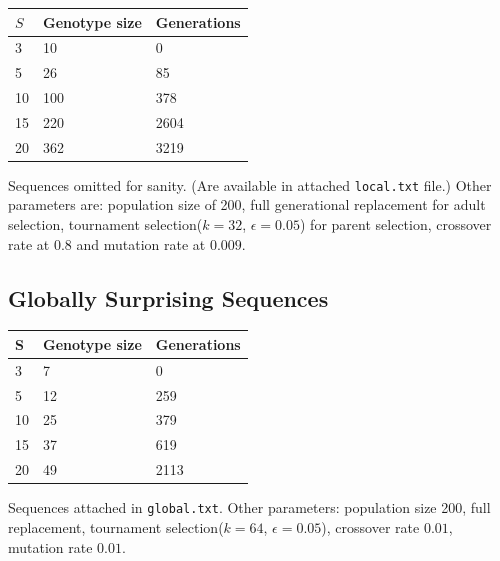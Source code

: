 \documentclass[twoside]{article}
\begin{document}
\begin{multicols}{2}
    \begin{table}[H]
        \centering
        \begin{tabular}{|l|l|l|}
            \hline
            $S$  & Genotype size & Generations \\ \hline
            3    & 10            & 0           \\ \hline
            5    & 26            & 85          \\ \hline
            10   & 100           & 378         \\ \hline
            15   & 220           & 2604        \\ \hline
            20   & 362           & 3219        \\ \hline
        \end{tabular}
    \end{table}

    Sequences omitted for sanity. (Are available in attached \texttt{local.txt} file.)
    Other parameters are: population size of 200, full generational replacement for adult selection, tournament selection($k=32$, $\epsilon = 0.05$) for parent selection, crossover rate at $0.8$ and mutation rate at $0.009$.


    \subsection{Globally Surprising Sequences}

    \begin{table}[H]
        \centering
        \begin{tabular}{|l|l|l|}
            \hline
            S  & Genotype size & Generations \\ \hline
            3  & 7             & 0           \\ \hline
            5  & 12            & 259         \\ \hline
            10 & 25            & 379         \\ \hline
            15 & 37            & 619         \\ \hline
            20 & 49            & 2113        \\ \hline
        \end{tabular}
    \end{table}

    Sequences attached in \texttt{global.txt}.
    Other parameters: population size 200, full replacement, tournament selection($k=64$, $\epsilon=0.05$), crossover rate $0.01$, mutation rate $0.01$.



\end{multicols}
\end{document}
